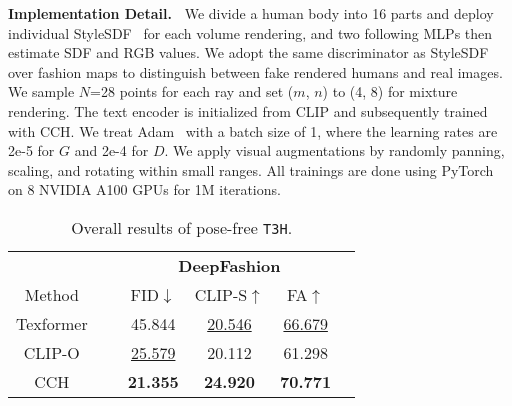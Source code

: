\documentclass[11pt]{article}
\newcommand{\tablestyle}[2]{\setlength{\tabcolsep}{#1}\renewcommand{\arraystretch}{#2}\centering\footnotesize}
\begin{document}
\vspace{1ex} \noindent \textbf{Implementation Detail.~}
We divide a human body into 16 parts and deploy individual StyleSDF~\cite{or-ei2022style-sdf} for each volume rendering, and two following MLPs then estimate SDF and RGB values. We adopt the same discriminator as StyleSDF over fashion maps to distinguish between fake rendered humans and real images. We sample $N$=28 points for each ray and set ($m$, $n$) to (4, 8) for mixture rendering. The text encoder is initialized from CLIP and subsequently trained with CCH. We treat Adam~\cite{kingma2015adam} with a batch size of 1, where the learning rates are 2e-5 for $G$ and 2e-4 for $D$. We apply visual augmentations by randomly panning, scaling, and rotating within small ranges. All trainings are done using PyTorch~\cite{paszke2017pytorch} on 8 NVIDIA A100 GPUs for 1M iterations.

\begin{table}[t]
\centering \tablestyle{5pt}{1.1}
    \begin{tabular}{cccccc}
        \toprule
        ~ & ~ & \multicolumn{3}{c}{\textbf{DeepFashion}} \\
        \cmidrule{3-5} Method & ~ & FID$\downarrow$ & CLIP-S$\uparrow$ & FA$\uparrow$ \\
        \midrule
        Texformer & ~ & 45.844 & \underline{20.546} & \underline{66.679} \\
        CLIP-O & ~ & \underline{25.579} & 20.112 & 61.298 \\
        CCH & ~ & \textbf{21.355} & \textbf{24.920} & \textbf{70.771} \\
        \bottomrule
    \end{tabular}
    \vspace{-1.5ex}
    \caption{Overall results of pose-free \texttt{T3H}.}
    \label{table:pose-free}
    \vspace{-1ex}
\end{table}
\end{document}

